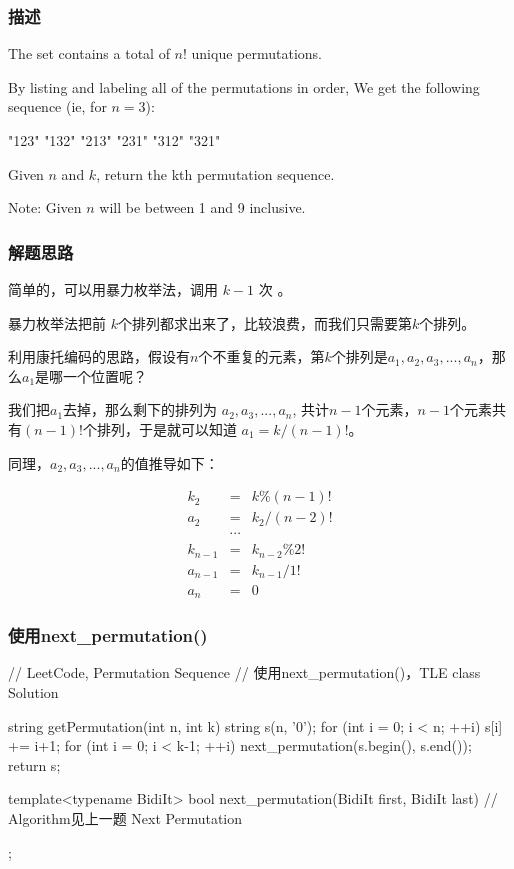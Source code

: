 \subsubsection{描述}
The set \fn{[1,2,3,…,n]} contains a total of $n!$ unique permutations.

By listing and labeling all of the permutations in order,
We get the following sequence (ie, for $n = 3$):
\begin{Code}
	"123"
	"132"
	"213"
	"231"
	"312"
	"321"
\end{Code}

Given $n$ and $k$, return the kth permutation sequence.

Note: Given $n$ will be between 1 and 9 inclusive.


\subsubsection{解题思路}
简单的，可以用暴力枚举法，调用 $k-1$ 次 。

暴力枚举法把前 $k$个排列都求出来了，比较浪费，而我们只需要第$k$个排列。

利用康托编码的思路，假设有$n$个不重复的元素，第$k$个排列是$a_1, a_2, a_3, ..., 
a_n$，那么$a_1$是哪一个位置呢？

我们把$a_1$去掉，那么剩下的排列为
$a_2, a_3, ..., a_n$, 共计$n-1$个元素，$n-1$个元素共有$(n-1)!$个排列，于是就可以知道 
$a_1 = k / (n-1)!$。

同理，$a_2, a_3, ..., a_n$的值推导如下：

\begin{eqnarray}
	k_2 &=& k\%(n-1)! \nonumber \\
	a_2 &=& k_2/(n-2)! \nonumber \\
	\quad & \cdots \nonumber \\
	k_{n-1} &=& k_{n-2}\%2! \nonumber \\
	a_{n-1} &=& k_{n-1}/1! \nonumber \\
	a_n &=& 0 \nonumber
\end{eqnarray}


\subsubsection{使用next_permutation()}
\begin{Code}
	// LeetCode, Permutation Sequence
	// 使用next_permutation()，TLE
	class Solution {
		string getPermutation(int n, int k) {
			string s(n, '0');
			for (int i = 0; i < n; ++i)
				s[i] += i+1;
			for (int i = 0; i < k-1; ++i)
				next_permutation(s.begin(), s.end());
			return s;
		}
		
		template<typename BidiIt>
		bool next_permutation(BidiIt first, BidiIt last) {
			// Algorithm见上一题 Next Permutation
		}
	};
\end{Code}


